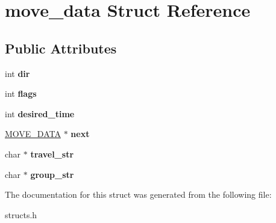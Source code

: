 \hypertarget{structmove__data}{\section{move\-\_\-data Struct Reference}
\label{structmove__data}
}
\subsection*{Public Attributes}
\begin{DoxyCompactItemize}
\item 
\hypertarget{structmove__data_a11e9cf46d09bdf985b70365e2937efc5}{int {\bfseries dir}}\label{structmove__data_a11e9cf46d09bdf985b70365e2937efc5}

\item 
\hypertarget{structmove__data_aae78dcc287c2ddc1672b4dced5693930}{int {\bfseries flags}}\label{structmove__data_aae78dcc287c2ddc1672b4dced5693930}

\item 
\hypertarget{structmove__data_a7c41b4b47c38ac031d71ce22514e813d}{int {\bfseries desired\-\_\-time}}\label{structmove__data_a7c41b4b47c38ac031d71ce22514e813d}

\item 
\hypertarget{structmove__data_a6ee2946da58be102d7cd1dd6a8b6b1bf}{\hyperlink{structmove__data}{M\-O\-V\-E\-\_\-\-D\-A\-T\-A} $\ast$ {\bfseries next}}\label{structmove__data_a6ee2946da58be102d7cd1dd6a8b6b1bf}

\item 
\hypertarget{structmove__data_a9828ffea5b0502f341fe3bf1f3954108}{char $\ast$ {\bfseries travel\-\_\-str}}\label{structmove__data_a9828ffea5b0502f341fe3bf1f3954108}

\item 
\hypertarget{structmove__data_ae11f708d9b104c9fd04020a47600206f}{char $\ast$ {\bfseries group\-\_\-str}}\label{structmove__data_ae11f708d9b104c9fd04020a47600206f}

\end{DoxyCompactItemize}


The documentation for this struct was generated from the following file\-:\begin{DoxyCompactItemize}
\item 
structs.\-h\end{DoxyCompactItemize}
